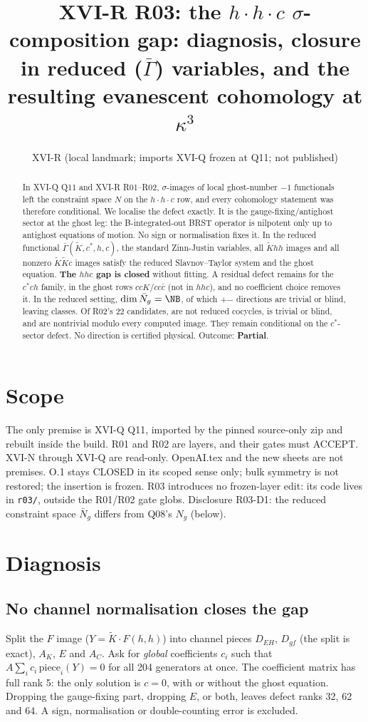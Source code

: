 \documentclass[11pt]{article}
\title{XVI-R R03: the $h\cdot h\cdot c$ $\sigma$-composition gap: diagnosis, closure in reduced
($\bar\Gamma$) variables, and the resulting evanescent cohomology at $\kappa^3$}
\author{XVI-R (local landmark; imports XVI-Q frozen at Q11; not published)}
\date{}
\begin{document}
\maketitle
\begin{abstract}
In XVI-Q Q11 and XVI-R R01--R02, $\sigma$-images of local ghost-number $-1$ functionals left the constraint space
$N$ on the $h\cdot h\cdot c$ row, and every cohomology statement was therefore conditional. We localise the defect exactly. It
is the gauge-fixing/antighost sector at the ghost leg: the B-integrated-out BRST operator is nilpotent only up to
antighost equations of motion. No sign or normalisation fixes it. In the reduced functional $\bar\Gamma(\tilde K,c^*,h,c)$,
the standard Zinn-Justin variables, all \NF{} $\tilde K hh$ images and all \NK{} nonzero $\tilde K\tilde K c$ images satisfy the
reduced Slavnov--Taylor system and the ghost equation. \textbf{The $hhc$ gap is closed} without fitting. A residual defect
remains for the $c^*ch$ family, in the ghost rows $ccK$/$cc\bar c$ (not in $hhc$), and no coefficient choice removes it. In the reduced setting,
$\dim\bar N_g=\NB$, of which \TB{}+\BG{}$-$\TCB{} directions are trivial or blind, leaving \HB{} classes. Of R02's 22
candidates, \TA{} are not reduced cocycles, \TT{} is trivial or blind, and \TN{} are nontrivial modulo every computed image. They remain
conditional on the $c^*$-sector defect. No direction is certified physical. Outcome: \textbf{Partial}.
\end{abstract}

\section{Scope}
The only premise is XVI-Q Q11, imported by the pinned source-only zip and rebuilt inside the build. R01 and R02 are layers, and their gates must ACCEPT.
XVI-N through XVI-Q are read-only. OpenAI.tex and the new sheets are not premises. O.1 stays CLOSED in its scoped sense only; bulk
symmetry is not restored; the insertion is frozen. R03 introduces no frozen-layer edit: its code lives in \texttt{r03/},
outside the R01/R02 gate globs. Disclosure R03-D1: the reduced constraint space $\bar N_g$ differs from Q08's $N_g$ (below).

\section{Diagnosis}
\subsection{No channel normalisation closes the gap}
Split the $F$ image ($Y=\tilde K\cdot F(h,h)$) into channel pieces $D_{EH}$, $D_{gf}$ (the split is exact), $A_K$, $E$ and $A_C$. Ask for
\emph{global} coefficients $c_i$ such that $A\sum_i c_i\,\mathrm{piece}_i(Y)=0$ for all 204 generators at once. The
coefficient matrix has full rank 5: the only solution is $c=0$, with or without the ghost equation. Dropping the gauge-fixing
part, dropping $E$, or both, leaves defect ranks 32, 62 and 64. A sign, normalisation or double-counting error is excluded.
\end{document}
